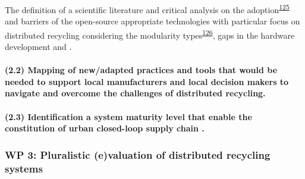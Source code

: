 \documentclass[
  12pt,
  a4paperpaper,
  onecolumn]{article}
\let\oldparagraph\paragraph
\renewcommand{\paragraph}[1]{\oldparagraph{#1}\mbox{}}
\let\paragraph\oldparagraph
\begin{document}
The definition of a scientific literature and critical analysis on the
adoption\textsuperscript{\protect\hyperlink{ref-reinauer2021}{125}} and
barriers of the open-source appropriate technologies with particular
focus on distributed recycling considering the modularity
types\textsuperscript{\protect\hyperlink{ref-gavras2021}{126}}, gaps in
the hardware development and .

\hypertarget{mapping-of-newadapted-practices-and-tools-that-would-be-needed-to-support-local-manufacturers-and-local-decision-makers-to-navigate-and-overcome-the-challenges-of-distributed-recycling.}{%
\paragraph{(2.2) Mapping of new/adapted practices and tools that would
be needed to support local manufacturers and local decision makers to
navigate and overcome the challenges of distributed
recycling.}\label{mapping-of-newadapted-practices-and-tools-that-would-be-needed-to-support-local-manufacturers-and-local-decision-makers-to-navigate-and-overcome-the-challenges-of-distributed-recycling.}}

\hypertarget{identification-a-system-maturity-level-that-enable-the-constitution-of-urban-closed-loop-supply-chain-.}{%
\paragraph{(2.3) Identification a system maturity level that enable the
constitution of urban closed-loop supply chain
.}\label{identification-a-system-maturity-level-that-enable-the-constitution-of-urban-closed-loop-supply-chain-.}}

\hypertarget{wp-3-pluralistic-evaluation-of-distributed-recycling-systems}{%
\subsubsection{WP 3: Pluralistic (e)valuation of distributed recycling
systems}\label{wp-3-pluralistic-evaluation-of-distributed-recycling-systems}}
\end{document}
